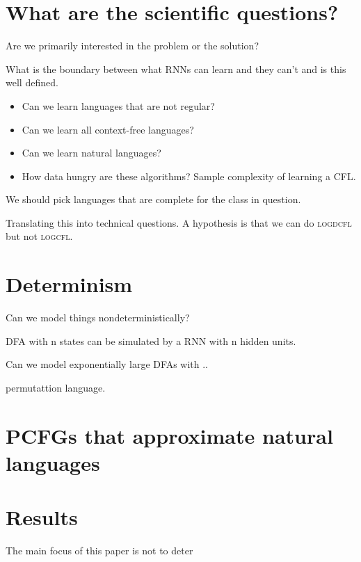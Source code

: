 \documentclass{article}
\begin{document}
\section{What are the scientific questions?}



Are we primarily interested in the problem or the solution?

What is the boundary between what RNNs can learn and they can't
and is this well defined. 
\begin{itemize}
	\item Can we learn languages that are not regular?

	\item Can we learn all context-free languages?

	\item Can we learn natural languages?

	\item How data hungry are these algorithms?
	Sample complexity of learning a CFL.
\end{itemize}


We should pick languages that are complete for the class in question.


Translating this into technical questions. 
A hypothesis is that we can do \textsc{logdcfl} but not \textsc{logcfl}.


\section{Determinism}

Can we model things nondeterministically?


DFA with n states can be simulated by a RNN with n hidden units.

Can we model exponentially large DFAs with ..


permutattion language.


\section{PCFGs that approximate natural languages}




\section{Results}

The main focus of this paper is not to deter
\end{document}

